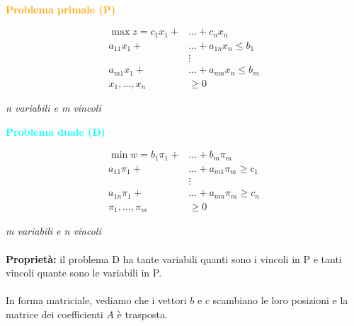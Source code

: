 \documentclass[a4paper, 11pt]{article}
\begin{document}
            \paragraph{}
            \noindent\begin{minipage}{0.48\textwidth}
            \noindent \textcolor{orange}{\textbf{Problema primale (P)}}

            \noindent \begin{align*}
            \max z = c_1 x_1 +& \dots + c_n x_n \\
            a_{11} x_1 +& \dots + a_{1n} x_n \leq b_1 \\
            & \vdots \\
            a_{m1} x_1 +& \dots + a_{mn} x_n \leq b_m \\
            x_1, \dots, x_n &\geq 0
            \end{align*}

            \noindent \textit{n variabili e m vincoli}
            \end{minipage}
            \hfill
            \begin{minipage}{0.48\textwidth}
            \noindent \textcolor{cyan}{\textbf{Problema duale (D)}}

            \noindent \begin{align*}
            \min w = b_1 \pi_1 +& \dots + b_m \pi_m \\
            a_{11} \pi_1 +& \dots + a_{m1} \pi_m \geq c_1 \\
            & \vdots \\
            a_{1n} \pi_1 +& \dots + a_{mn} \pi_m \geq c_n \\
            \pi_1, \dots, \pi_m &\geq 0
            \end{align*}

            \noindent \textit{m variabili e n vincoli}
            \end{minipage}

            \paragraph{}
            \textbf{Proprietà: } il problema D ha tante variabili quanti sono i vincoli in P e tanti vincoli quante sono le variabili in P.

            \paragraph{}
            \noindent In forma matriciale, vediamo che i vettori $b$ e $c$ scambiano le loro posizioni e la matrice dei coefficienti $A$ è trasposta.
\end{document}
